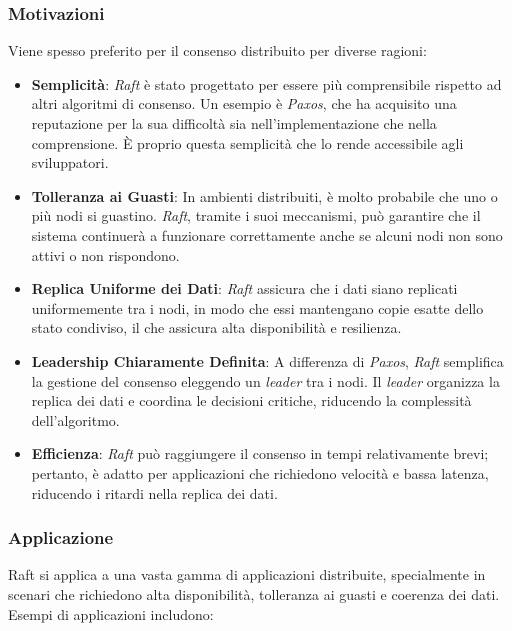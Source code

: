 \subsubsection{Motivazioni}
Viene spesso preferito per il consenso distribuito per diverse ragioni:
\begin{itemize}
  \item \textbf{Semplicità}: \textit{Raft} è stato progettato per essere più comprensibile rispetto ad altri algoritmi di consenso. Un esempio è \textit{Paxos}, che ha acquisito una reputazione per la sua difficoltà sia 
  nell'implementazione che nella comprensione. È proprio questa semplicità che lo rende accessibile agli sviluppatori.
  
  \item \textbf{Tolleranza ai Guasti}: In ambienti distribuiti, è molto probabile che uno o più nodi si guastino. \textit{Raft}, tramite i suoi meccanismi, può garantire che il sistema continuerà a funzionare correttamente 
  anche se alcuni nodi non sono attivi o non rispondono.

  \item \textbf{Replica Uniforme dei Dati}: \textit{Raft} assicura che i dati siano replicati uniformemente tra i nodi, in modo che essi mantengano copie esatte dello stato condiviso, il che assicura alta disponibilità e resilienza.

  \item \textbf{Leadership Chiaramente Definita}: A differenza di \textit{Paxos}, \textit{Raft} semplifica la gestione del consenso eleggendo un \textit{leader} tra i nodi. Il \textit{leader} organizza la replica dei dati 
  e coordina le decisioni critiche, riducendo la complessità dell'algoritmo.

  \item \textbf{Efficienza}: \textit{Raft} può raggiungere il consenso in tempi relativamente brevi; pertanto, è adatto per applicazioni che richiedono velocità e bassa latenza, riducendo i ritardi nella replica dei dati.

\end{itemize}


\subsubsection{Applicazione}
Raft si applica a una vasta gamma di applicazioni distribuite, specialmente in scenari che richiedono alta disponibilità, tolleranza ai guasti e coerenza dei dati. Esempi di applicazioni includono:

